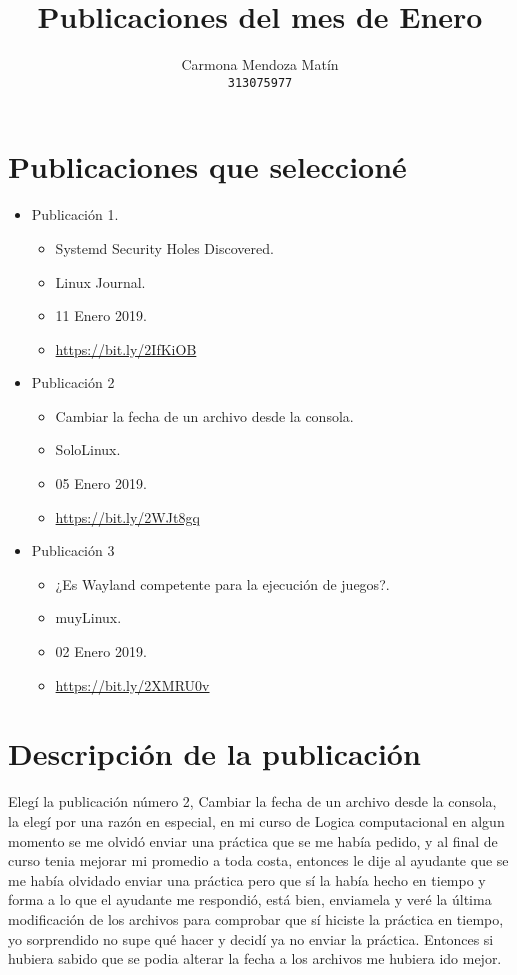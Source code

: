 \documentclass[11pt, a4paper]{report}
\begin{document}
\title{Publicaciones del mes de Enero}
\author{
  Carmona Mendoza Mat\'in\\
  \texttt{313075977}
}
\date{}
\maketitle

\section*{Publicaciones que seleccioné}
\begin{itemize}

\item Publicación 1.
  \begin{itemize}
  \item Systemd Security Holes Discovered.
  \item Linux Journal.
  \item 11 Enero 2019.
  \item \url{https://bit.ly/2IfKiOB}
  \end{itemize}
  
\item Publicación 2
  \begin{itemize}
  \item Cambiar la fecha de un archivo desde la consola.
  \item SoloLinux.
  \item 05 Enero 2019. 
  \item \url{https://bit.ly/2WJt8gq}
  \end{itemize}

\item Publicación 3
  \begin{itemize}
  \item ¿Es Wayland competente para la ejecución de juegos?.
  \item muyLinux.
  \item 02 Enero 2019.
  \item \url{https://bit.ly/2XMRU0v}
  \end{itemize}
\end{itemize}  

\section*{Descripción de la publicación}
Elegí la publicación número 2, Cambiar la fecha de un archivo desde la consola,
la elegí por una razón en especial, en mi curso de Logica computacional en algun
momento se me olvidó enviar una práctica que se me había pedido, y al final de
curso tenia mejorar mi promedio a toda costa, entonces le dije al ayudante que
se me había olvidado enviar una práctica pero que sí la había hecho en tiempo y
forma a lo que el ayudante me respondió, está bien, enviamela y veré la última
modificación de los archivos para comprobar que sí hiciste la práctica en
tiempo, yo sorprendido no supe qué hacer y decidí ya no enviar la práctica.
Entonces si hubiera sabido que se podia alterar la fecha a los archivos me
hubiera ido mejor. \\
\end{document}
